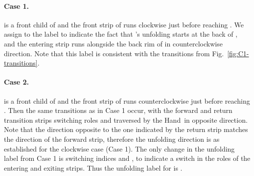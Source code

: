 \documentclass[11pt]{article}
\newcommand\hand{{\sc Hand}}
\begin{document}
\begin{table}[htpb]
\begin{small}
\end{small}
\end{table}

\paragraph{Case 1.}  is a front child of  and the front strip of  runs clockwise just before reaching . We assign to  the label  to indicate the fact that 's unfolding starts at the back of , and the entering strip runs alongside the back rim of  in counterclockwise direction. Note that this label is consistent with the transitions from Fig.~\ref{fig:C1-transitions}.

\paragraph{Case 2.}  is a front child of  and the front strip of  runs counterclockwise just before reaching . Then the same transitions as in Case 1 occur, with the forward and return transition strips switching roles and traversed by the \hand\ in opposite direction. Note that the direction opposite to the one indicated by the return strip matches the direction of the forward strip, therefore the unfolding direction is as established for the clockwise case (Case 1). The only change in the unfolding label from Case 1 is switching indices  and , to indicate a switch in the roles of the entering and exiting strips. Thus the unfolding label for  is . 
\end{document}
